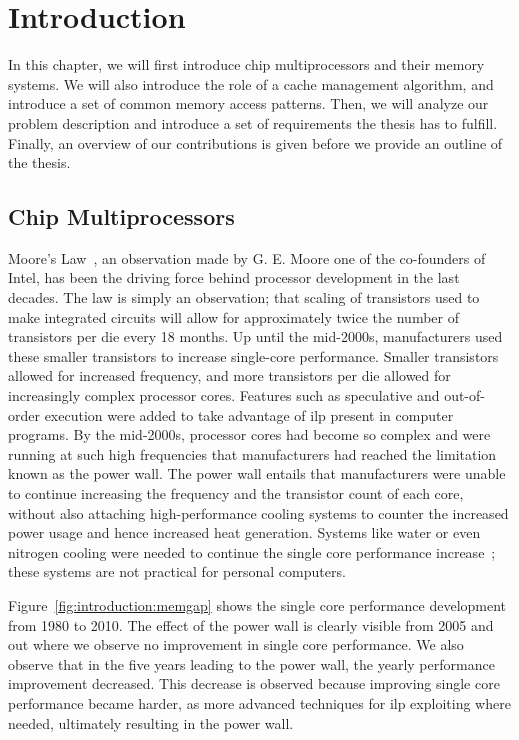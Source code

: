 \chapter{Introduction}
\label{cpt:introduction}

In this chapter, we will first introduce chip multiprocessors and their memory systems.
We will also introduce the role of a cache management algorithm, and introduce a set of common memory access patterns.
Then, we will analyze our problem description and introduce a set of requirements the thesis has to fulfill.
Finally, an overview of our contributions is given before we provide an outline of the thesis.

\section{Chip Multiprocessors}

Moore's Law~\cite{Moore1998}, an observation made by G. E. Moore one of the co-founders of Intel, has been the driving force behind processor development in the last decades.
The law is simply an observation; that scaling of transistors used to make integrated circuits will allow for approximately twice the number of transistors per die every 18 months.
Up until the mid-2000s, manufacturers used these smaller transistors to increase single-core performance.
Smaller transistors allowed for increased frequency, and more transistors per die allowed for increasingly complex processor cores.
Features such as speculative and out-of-order execution were added to take advantage of \gls{ilp} present in computer programs.
By the mid-2000s, processor cores had become so complex and were running at such high frequencies that manufacturers had reached the limitation known as the power wall.
The power wall entails that manufacturers were unable to continue increasing the frequency and the transistor count of each core, without also attaching high-performance cooling systems to counter the increased power usage and hence increased heat generation.
Systems like water or even nitrogen cooling were needed to continue the single core performance increase~\cite{Sutter2005}; these systems are not practical for personal computers.

Figure~\ref{fig:introduction:memgap} shows the single core performance development from 1980 to 2010.
The effect of the power wall is clearly visible from 2005 and out where we observe no improvement in single core performance.
We also observe that in the five years leading to the power wall, the yearly performance improvement decreased.
This decrease is observed because improving single core performance became harder, as more advanced techniques for \gls{ilp} exploiting where needed, ultimately resulting in the power wall.

